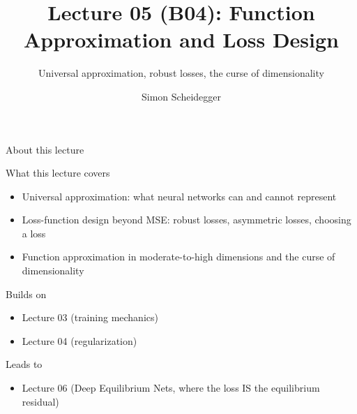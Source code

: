 \documentclass[aspectratio=169,11pt]{beamer}
\title[Lecture 05 (B04)]{Lecture 05 (B04): Function Approximation and Loss Design}
\subtitle{Universal approximation, robust losses, the curse of dimensionality}
\author{Simon Scheidegger}
\institute{HEC, University of Lausanne}
\date{}
\begin{document}
{
\begin{frame}
\titlepage
\end{frame}
}

\begin{frame}{About this lecture}
\small
\begin{block}{What this lecture covers}
\begin{itemize}\itemsep2pt
  \item Universal approximation: what neural networks can and cannot represent
  \item Loss-function design beyond MSE: robust losses, asymmetric losses, choosing a loss
  \item Function approximation in moderate-to-high dimensions and the curse of dimensionality
\end{itemize}
\end{block}
\begin{block}{Builds on}
\begin{itemize}\itemsep2pt
  \item Lecture 03 (training mechanics)
  \item Lecture 04 (regularization)
\end{itemize}
\end{block}
\begin{block}{Leads to}
\begin{itemize}\itemsep2pt
  \item Lecture 06 (Deep Equilibrium Nets, where the loss IS the equilibrium residual)
\end{itemize}
\end{block}
\end{frame}
\end{document}
